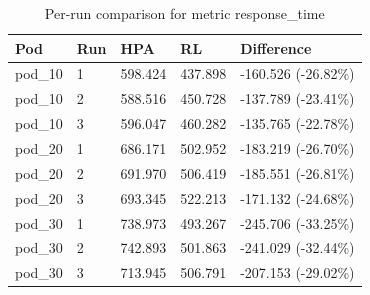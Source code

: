 \begin{table}[ht]
  \centering
  \caption{Per-run comparison for metric response\_time}\label{tab:deskriptif-response-time-per-run}
  \begin{tabular}{lllll}
    \toprule
    Pod & Run & HPA & RL & Difference \\
    \midrule
    pod\_10 & 1 & 598.424 & 437.898 & -160.526 (-26.82\%) \\
    pod\_10 & 2 & 588.516 & 450.728 & -137.789 (-23.41\%) \\
    pod\_10 & 3 & 596.047 & 460.282 & -135.765 (-22.78\%) \\
    pod\_20 & 1 & 686.171 & 502.952 & -183.219 (-26.70\%) \\
    pod\_20 & 2 & 691.970 & 506.419 & -185.551 (-26.81\%) \\
    pod\_20 & 3 & 693.345 & 522.213 & -171.132 (-24.68\%) \\
    pod\_30 & 1 & 738.973 & 493.267 & -245.706 (-33.25\%) \\
    pod\_30 & 2 & 742.893 & 501.863 & -241.029 (-32.44\%) \\
    pod\_30 & 3 & 713.945 & 506.791 & -207.153 (-29.02\%) \\
    \bottomrule
  \end{tabular}
\end{table}